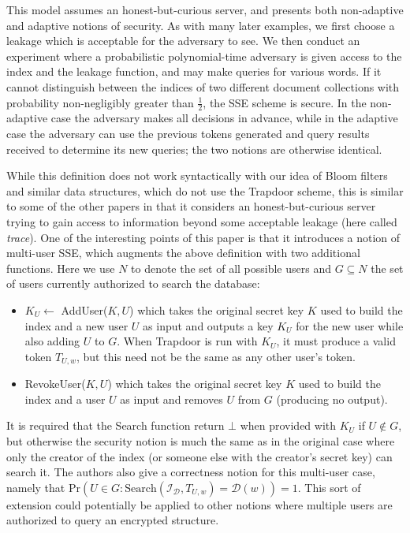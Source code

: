 \documentclass[11pt, pdftex]{article}
\begin{document}
This model assumes an honest-but-curious server, and presents both non-adaptive and adaptive notions of security. As with many later examples, we first choose a leakage which is acceptable for the adversary to see. We then conduct an experiment where a probabilistic polynomial-time adversary is given access to the index and the leakage function, and may make queries for various words. If it cannot distinguish between the indices of two different document collections with probability non-negligibly greater than $\frac{1}{2}$, the SSE scheme is secure. In the non-adaptive case the adversary makes all decisions in advance, while in the adaptive case the adversary can use the previous tokens generated and query results received to determine its new queries; the two notions are otherwise identical.

While this definition does not work syntactically with our idea of Bloom filters and similar data structures, which do not use the Trapdoor scheme, this is similar to some of the other papers in that it considers an honest-but-curious server trying to gain access to information beyond some acceptable leakage (here called {\em trace}). One of the interesting points of this paper is that it introduces a notion of multi-user SSE, which augments the above definition with two additional functions. Here we use $N$ to denote the set of all possible users and $G \subseteq N$ the set of users currently authorized to search the database:

\begin{itemize}
	\item $K_U \gets$ AddUser($K,U$) which takes the original secret key $K$ used to build the index and a new user $U$ as input and outputs a key $K_U$ for the new user while also adding $U$ to $G$. When Trapdoor is run with $K_U$, it must produce a valid token $T_{U,w}$, but this need not be the same as any other user's token.
	\item RevokeUser($K,U$) which takes the original secret key $K$ used to build the index and a user $U$ as input and removes $U$ from $G$ (producing no output).
\end{itemize}

It is required that the Search function return $\bot$ when provided with $K_U$ if $U \not\in G$, but otherwise the security notion is much the same as in the original case where only the creator of the index (or someone else with the creator's secret key) can search it. The authors also give a correctness notion for this multi-user case, namely that $\mathrm{Pr}(U \in G : \mathrm{Search}(\mathcal{I}_\mathcal{D},T_{U,w}) = \mathcal{D}(w)) = 1$. This sort of extension could potentially be applied to other notions where multiple users are authorized to query an encrypted structure.
\end{document}
